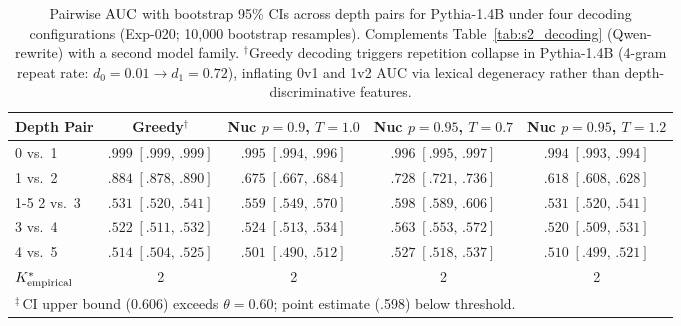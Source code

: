 \begin{table}[t]
  \centering
  \small
  \caption{Pairwise $\text{AUC}$ with bootstrap 95\% CIs across depth pairs for Pythia-1.4B under four decoding configurations (Exp-020; 10{,}000 bootstrap resamples). Complements Table~\ref{tab:s2_decoding} (Qwen-rewrite) with a second model family. $^\dagger$Greedy decoding triggers repetition collapse in Pythia-1.4B (4-gram repeat rate: $d_0{=}0.01 \to d_1{=}0.72$), inflating 0v1 and 1v2 AUC via lexical degeneracy rather than depth-discriminative features.}
  \label{tab:s10_pythia_decoding}
  \begin{tabular}{lcccc}
    \toprule
    \textbf{Depth Pair} & \textbf{Greedy}$^\dagger$ & \textbf{Nuc $p{=}0.9$, $T{=}1.0$} & \textbf{Nuc $p{=}0.95$, $T{=}0.7$} & \textbf{Nuc $p{=}0.95$, $T{=}1.2$} \\
    \midrule
    0 vs.\ 1 & $.999\;[.999,\,.999]$ & $.995\;[.994,\,.996]$ & $.996\;[.995,\,.997]$ & $.994\;[.993,\,.994]$ \\
    1 vs.\ 2 & $.884\;[.878,\,.890]$ & $.675\;[.667,\,.684]$ & $.728\;[.721,\,.736]$ & $.618\;[.608,\,.628]$ \\
    \cmidrule(lr){1-5}
    2 vs.\ 3 & $.531\;[.520,\,.541]$ & $.559\;[.549,\,.570]$ & $.598\;[.589,\,.606]$\rlap{$^\ddagger$} & $.531\;[.520,\,.541]$ \\
    3 vs.\ 4 & $.522\;[.511,\,.532]$ & $.524\;[.513,\,.534]$ & $.563\;[.553,\,.572]$ & $.520\;[.509,\,.531]$ \\
    4 vs.\ 5 & $.514\;[.504,\,.525]$ & $.501\;[.490,\,.512]$ & $.527\;[.518,\,.537]$ & $.510\;[.499,\,.521]$ \\
    \midrule
    ${K^*_{\text{empirical}}}$ & 2 & 2 & 2 & 2 \\
    \bottomrule
    \multicolumn{5}{l}{${}^{\ddagger}$\,CI upper bound (0.606) exceeds $\theta{=}0.60$; point estimate (.598) below threshold.} \\
  \end{tabular}
\end{table}

